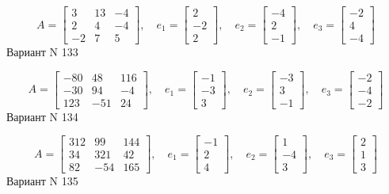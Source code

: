 \documentclass[11pt]{report}
\begin{document}
$$A = \left[\begin{matrix}3 & 13 & -4\\2 & 4 & -4\\-2 & 7 & 5\end{matrix}\right],\quad e_1 = \left[\begin{matrix}2\\-2\\2\end{matrix}\right],\quad e_2 = \left[\begin{matrix}-4\\2\\-1\end{matrix}\right],\quad e_3 = \left[\begin{matrix}-2\\4\\-4\end{matrix}\right]$$Вариант N 133

$$A = \left[\begin{matrix}-80 & 48 & 116\\-30 & 94 & -4\\123 & -51 & 24\end{matrix}\right],\quad e_1 = \left[\begin{matrix}-1\\-3\\3\end{matrix}\right],\quad e_2 = \left[\begin{matrix}-3\\3\\-1\end{matrix}\right],\quad e_3 = \left[\begin{matrix}-2\\-4\\-2\end{matrix}\right]$$Вариант N 134

$$A = \left[\begin{matrix}312 & 99 & 144\\34 & 321 & 42\\82 & -54 & 165\end{matrix}\right],\quad e_1 = \left[\begin{matrix}-1\\2\\4\end{matrix}\right],\quad e_2 = \left[\begin{matrix}1\\-4\\3\end{matrix}\right],\quad e_3 = \left[\begin{matrix}2\\1\\3\end{matrix}\right]$$Вариант N 135
\end{document}
